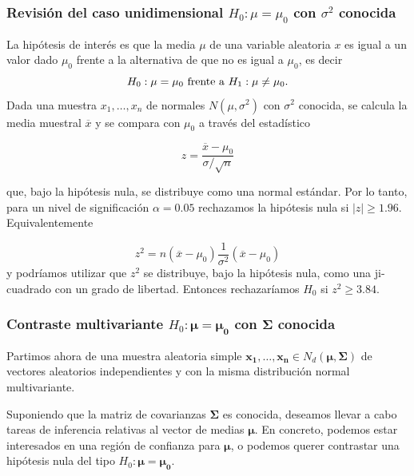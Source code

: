 \documentclass[
  a4paper,
  oneside]{scrbook}
\theoremstyle{definition}
\theoremstyle{definition}
\theoremstyle{definition}
\theoremstyle{definition}
\theoremstyle{remark}
\begin{document}
\subsubsection{\texorpdfstring{Revisión del caso unidimensional \(H_0:\mu=\mu_0\) con \(\sigma^2\) conocida}{Revisión del caso unidimensional H\_0:\textbackslash mu=\textbackslash mu\_0 con \textbackslash sigma\^{}2 conocida}}\label{revision-del-caso-unidimensional-h-0-mu-mu-0-con-sigma-2-conocida}

La hipótesis de interés es que la media \(\mu\) de una variable aleatoria
\(x\) es igual a un valor dado \(\mu_0\) frente a la alternativa de que no
es igual a \(\mu_0\), es decir
\[H_0:\mu=\mu_0\textnormal{ frente a }H_1:\mu\neq\mu_0.\] Dada una
muestra \(x_1,\ldots,x_n\) de normales \(N(\mu,\sigma^2)\) con \(\sigma^2\)
conocida, se calcula la media muestral \(\overline{x}\) y se compara con
\(\mu_0\) a través del estadístico

\[z=\frac{\overline{x}-\mu_0}{\sigma/\sqrt{n}}\]

que, bajo la hipótesis
nula, se distribuye como una normal estándar. Por lo tanto, para un
nivel de significación \(\alpha=0.05\) rechazamos la hipótesis nula si
\(\left|z\right|\geq 1.96\). Equivalentemente

\[z^2=n(\overline{x}-\mu_0)\frac{1}{\sigma^2}(\overline{x}-\mu_0)\]
y podríamos utilizar que \(z^2\) se distribuye, bajo la hipótesis nula, como
una ji-cuadrado con un grado de libertad. Entonces rechazaríamos \(H_0\)
si \(z^2\geq 3.84\).

\subsubsection{\texorpdfstring{Contraste multivariante \(H_0:\bm\mu=\bm{\mu_0}\) con \(\bm\Sigma\) conocida}{Contraste multivariante H\_0:\textbackslash bm\textbackslash mu=\textbackslash bm\{\textbackslash mu\_0\} con \textbackslash bm\textbackslash Sigma conocida}}\label{contraste-multivariante-h-0-bm-mu-bm-mu-0-con-bm-sigma-conocida}

Partimos ahora de una muestra aleatoria simple \(\bm{x_1},\ldots,\bm{x_n}\in N_d(\bm{\mu},\bm\Sigma)\)
de vectores
aleatorios independientes y con la misma distribución normal
multivariante.

Suponiendo que la matriz de covarianzas \(\bm\Sigma\) es conocida,
deseamos llevar a cabo tareas de inferencia relativas al vector de
medias \(\bm{\mu}\). En concreto, podemos estar interesados en una región
de confianza para \(\bm{\mu}\), o podemos querer contrastar una hipótesis
nula del tipo \(H_0:\bm{\mu}=\bm{\mu_0}\).
\end{document}
